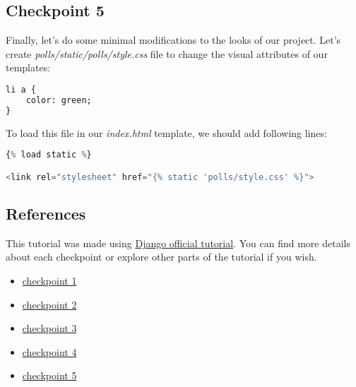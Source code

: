 \documentclass{homework}
\begin{document}
\subsection*{Checkpoint 5}
Finally, let's do some minimal modifications to the looks of our project. Let's create \textit{polls/static/polls/style.css} file to change the visual attributes of our templates:
\begin{lstlisting}[language=HTML]
li a {
    color: green;
}
\end{lstlisting}
To load this file in our \textit{index.html} template, we should add following lines:
\begin{lstlisting}[language=Python]
{% load static %}

<link rel="stylesheet" href="{% static 'polls/style.css' %}">
\end{lstlisting}

\subsection*{References}
This tutorial was made using \href{https://docs.djangoproject.com/en/4.1/intro/tutorial01/}{Django official tutorial}. You can find more details about each checkpoint or explore other parts of the tutorial if you wish.

\begin{itemize}
    \item \href{https://docs.djangoproject.com/en/4.1/intro/tutorial01/}{checkpoint 1}
    \item \href{https://docs.djangoproject.com/en/4.1/intro/tutorial02/}{checkpoint 2}
    \item \href{https://docs.djangoproject.com/en/4.1/intro/tutorial03/}{checkpoint 3}
    \item \href{https://docs.djangoproject.com/en/4.1/intro/tutorial04/}{checkpoint 4}
    \item \href{https://docs.djangoproject.com/en/4.1/intro/tutorial06/}{checkpoint 5}
\end{itemize}
\end{document}
